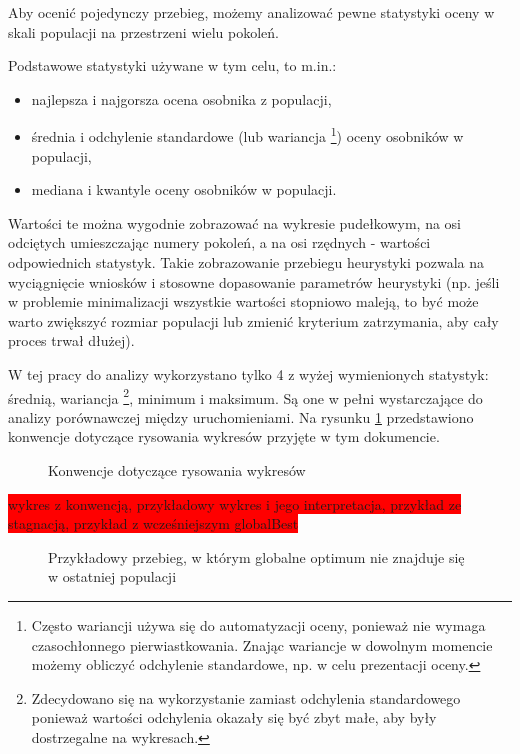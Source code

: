 \documentclass[twoside]{iisthesis}
\newcommand{\todo}{\colorbox{red}}
\newcommand{\graph}[1]{}
\begin{document}
Aby ocenić pojedynczy przebieg, możemy analizować pewne statystyki oceny w skali populacji na przestrzeni wielu pokoleń.

Podstawowe statystyki używane w tym celu, to m.in.:
\begin{itemize}
	\item najlepsza i najgorsza ocena osobnika z populacji,
	\item średnia i odchylenie standardowe (lub wariancja \footnote{Często wariancji używa się do automatyzacji oceny, ponieważ nie wymaga czasochłonnego pierwiastkowania. Znając wariancje w dowolnym momencie możemy obliczyć odchylenie standardowe, np. w celu prezentacji oceny.}) oceny osobników w populacji,
	\item mediana i kwantyle oceny osobników w populacji.
\end{itemize}

Wartości te można wygodnie zobrazować na wykresie pudełkowym, na osi odciętych umieszczając numery pokoleń, a na osi rzędnych - wartości odpowiednich statystyk. Takie zobrazowanie przebiegu heurystyki pozwala na wyciągnięcie wniosków i stosowne dopasowanie parametrów heurystyki (np. jeśli w problemie minimalizacji wszystkie wartości stopniowo maleją, to być może warto zwiększyć rozmiar populacji lub zmienić kryterium zatrzymania, aby cały proces trwał dłużej).

W tej pracy do analizy wykorzystano tylko 4 z wyżej wymienionych statystyk: średnią, wariancja \footnote{Zdecydowano się na wykorzystanie zamiast odchylenia standardowego ponieważ wartości odchylenia okazały się być zbyt małe, aby były dostrzegalne na wykresach.}, minimum i maksimum. Są one w pełni wystarczające do analizy porównawczej między uruchomieniami. Na rysunku \ref{plot_conventions} przedstawiono konwencje dotyczące rysowania wykresów przyjęte w tym dokumencie.

\begin{figure}[H]
	\caption{Konwencje dotyczące rysowania wykresów \label{plot_conventions}}
	\centering
	\graph{example_whiskers.tex}
%	
\end{figure}

\todo{wykres z konwencją, przykładowy wykres i jego interpretacja, przykład ze stagnacją, przykład z wcześniejszym globalBest}

\begin{figure}[H]
	\caption{Przykładowy przebieg, w którym globalne optimum nie znajduje się w ostatniej populacji \label{plot_mid_opt}}
	\centering
	\graph{mid_optimum.tex}
\end{figure}
\end{document}
